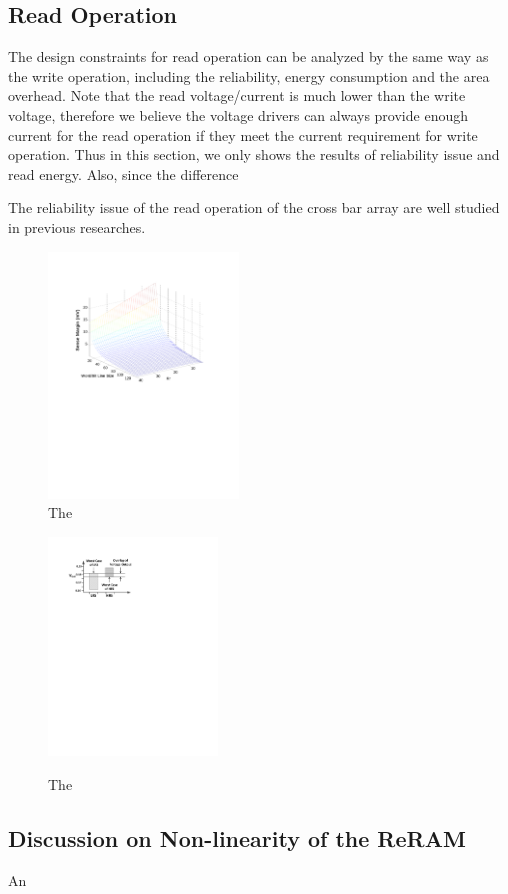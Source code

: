\subsection{Read Operation}
The design constraints for read operation can be analyzed by the same way as the write operation, including the reliability, energy consumption and the area overhead. Note that the read voltage/current is much lower than the write voltage, therefore we believe the voltage drivers can always provide enough current for the read operation if they meet the current requirement for write operation. Thus in this section, we only shows the results of reliability issue and read energy. Also, since the difference

The reliability issue of the read operation of the cross bar array are well studied in previous researches.
\begin{figure}%
\centering
  \includegraphics[width=0.45\textwidth]{./figures/margin.pdf}
  \caption{The}\label{fig:margin}
\end{figure}

\begin{figure}%
\centering
  \includegraphics[width=0.4\textwidth]{./figures/overlap.pdf}\\
  \caption{The}\label{fig:overlap}
\end{figure} 
\subsection{Discussion on Non-linearity of the ReRAM}
An

